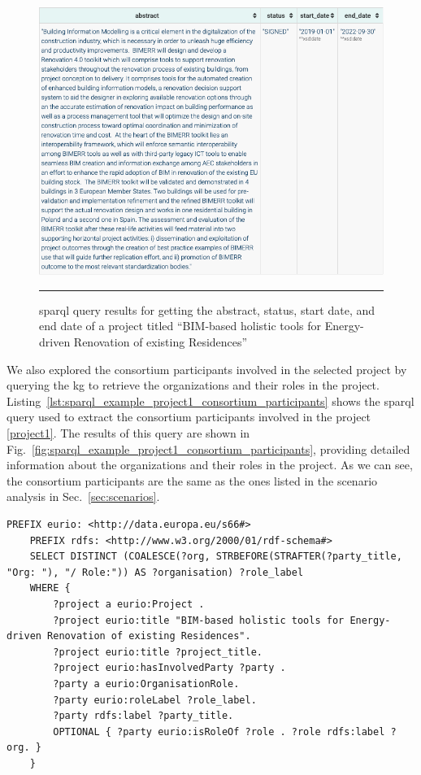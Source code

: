 \begin{figure}[htbp]
    \centering
 \includegraphics[width=.8\textwidth]{figures/architecture/sparql_example_project1_data_properties.png}
     \rule{35em}{0.5pt}
    \caption{\gls{sparql} query results for getting the abstract, status, start date, and end date of a project titled ``BIM-based holistic tools for Energy-driven Renovation of existing Residences''}
 \label{fig:sparql_example_project1_data_properties}
\end{figure}

We also explored the consortium participants involved in the selected project by querying the \gls{kg} to retrieve the organizations and their roles in the project.
Listing~\ref{lst:sparql_example_project1_consortium_participants} shows the \gls{sparql} query used to extract the consortium participants involved in the project \ref{project1}.
The results of this query are shown in Fig.~\ref{fig:sparql_example_project1_consortium_participants}, providing detailed information about the organizations and their roles in the project.
As we can see, the consortium participants are the same as the ones listed in the scenario analysis in Sec.~\ref{sec:scenarios}.

\begin{lstlisting}[language=SPARQL, caption={\gls{sparql} query for getting the consortium participants involved in a project titled ``BIM-based holistic tools for Energy-driven Renovation of existing Residences''}, label=lst:sparql_example_project1_consortium_participants]
    PREFIX eurio: <http://data.europa.eu/s66#>
    PREFIX rdfs: <http://www.w3.org/2000/01/rdf-schema#>
    SELECT DISTINCT (COALESCE(?org, STRBEFORE(STRAFTER(?party_title, "Org: "), "/ Role:")) AS ?organisation) ?role_label
    WHERE {
        ?project a eurio:Project .
        ?project eurio:title "BIM-based holistic tools for Energy-driven Renovation of existing Residences".
        ?project eurio:title ?project_title.
        ?project eurio:hasInvolvedParty ?party .
        ?party a eurio:OrganisationRole.
        ?party eurio:roleLabel ?role_label.
        ?party rdfs:label ?party_title.
        OPTIONAL { ?party eurio:isRoleOf ?role . ?role rdfs:label ?org. }
    }
\end{lstlisting}

